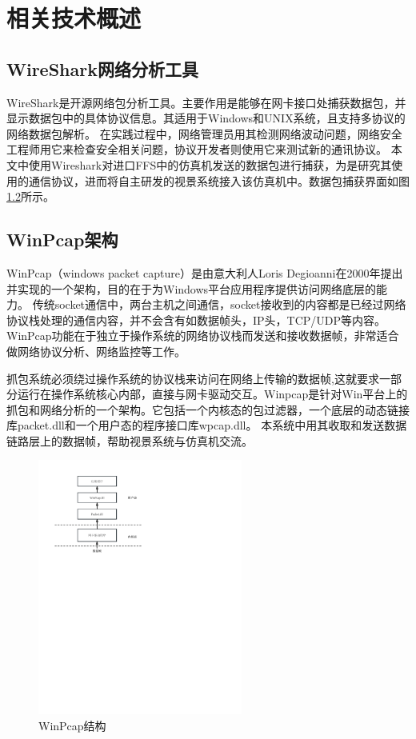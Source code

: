 \chapter{相关技术概述}
\section{WireShark网络分析工具}
WireShark是开源网络包分析工具。主要作用是能够在网卡接口处捕获数据包，并显示数据包中的具体协议信息\cite{wireshark1}。其适用于Windows和UNIX系统，且支持多协议的网络数据包解析。
在实践过程中，网络管理员用其检测网络波动问题，网络安全工程师用它来检查安全相关问题，协议开发者则使用它来测试新的通讯协议\cite{wireshark2}。
本文中使用Wireshark对进口FFS中的仿真机发送的数据包进行捕获，为是研究其使用的通信协议，进而将自主研发的视景系统接入该仿真机中。数据包捕获界面如图\ref{}所示。
\section{WinPcap架构}
WinPcap（windows packet capture）是由意大利人Loris Degioanni在2000年提出并实现的一个架构，目的在于为Windows平台应用程序提供访问网络底层的能力\cite{winpcap1}。
传统socket通信中，两台主机之间通信，socket接收到的内容都是已经过网络协议栈处理的通信内容，并不会含有如数据帧头，IP头，TCP/UDP等内容。WinPcap功能在于独立于操作系统的网络协议栈而发送和接收数据帧，非常适合做网络协议分析、网络监控等工作\cite{winpcap2}。
\par
抓包系统必须绕过操作系统的协议栈来访问在网络上传输的数据帧,这就要求一部分运行在操作系统核心内部，直接与网卡驱动交互。Winpcap是针对Win平台上的抓包和网络分析的一个架构。它包括一个内核态的包过滤器，一个底层的动态链接库packet.dll和一个用户态的程序接口库wpcap.dll\cite{winpcap3}。
本系统中用其收取和发送数据链路层上的数据帧，帮助视景系统与仿真机交流。
\begin{figure}[h!]
    \begin{center}
        \includegraphics[width=0.6\textwidth]{pictures/winpcap.pdf}
        \caption{WinPcap结构}
        \label{wincapstruc}
    \end{center}
\end{figure}
